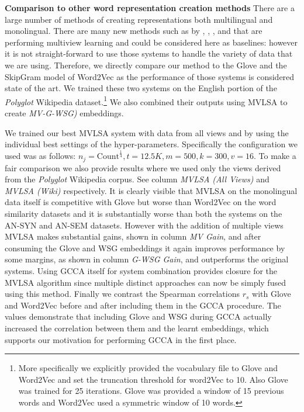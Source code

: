 \documentclass[11pt]{article}
\begin{document}
\noindent\textbf{Comparison to other word representation creation
  methods} There are a large number of methods of creating
representations both multilingual and monolingual. There are many new
methods such as by ,
, , and
 that are performing multiview learning and
could be considered here as baselines: however it is not
straight-forward to use those systems to handle the variety of data
that we are using. Therefore, we directly compare our method to the
Glove and the SkipGram model of Word2Vec as the performance of those
systems is considered state of the art.  We trained these two systems
on the English portion of the \textit{Polyglot} Wikipedia
dataset.\footnote{More specifically we explicitly provided the
  vocabulary file to Glove and Word2Vec and set the truncation
  threshold for word2Vec to 10. Also Glove was trained for 25
  iterations. Glove was provided a window of 15 previous words and
  Word2Vec used a symmetric window of 10 words.} We also combined
their outputs using MVLSA to create \emph{MV-G-WSG)}
embeddings.

We trained our best MVLSA system with data from all views and by using
the individual best settings of the hyper-parameters. Specifically the
configuration we used was as follows: $n_j = \text{Count}^\frac{1}{4},
t=12.5K, m=500, k=300, v=16$. To make a fair comparison we also
provide results where we used only the views derived from the
\textit{Polyglot} Wikipedia corpus. See column \emph{MVLSA (All
  Views)} and \emph{MVLSA (Wiki)} respectively. It is clearly visible
that MVLSA on the monolingual data itself is competitive with Glove
but worse than Word2Vec on the word similarity datasets and it is
substantially worse than both the systems on the AN-SYN and AN-SEM
datasets. However with the addition of multiple views MVLSA makes
substantial gains, shown in column \emph{MV Gain}, and after consuming
the Glove and WSG embeddings it again improves performance by some
margins, as shown in column \emph{G-WSG Gain}, and outperforms the
original systems.  Using GCCA itself for system combination provides
closure for the MVLSA algorithm since multiple distinct approaches can
now be simply fused using this method. Finally we contrast the
Spearman correlations $r_s$ with Glove and Word2Vec before and after
including them in the GCCA procedure. The values demonstrate that
including Glove and WSG during GCCA actually increased the correlation
between them and the learnt embeddings, which supports our motivation
for performing GCCA in the first place.
\end{document}
